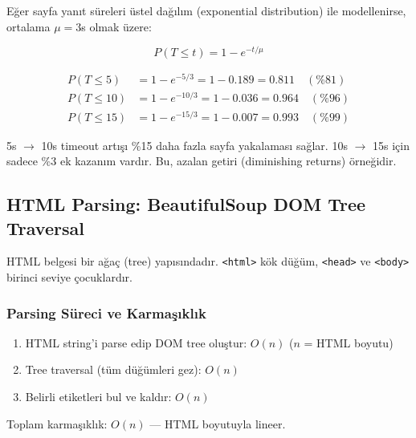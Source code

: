 E\u{g}er sayfa yan{\i}t s\"{u}releri \"{u}stel da\u{g}{\i}l{\i}m (exponential distribution) ile modellenirse, ortalama $\mu = 3$s olmak \"{u}zere:

\begin{equation}
P(T \leq t) = 1 - e^{-t/\mu}
\label{eq:timeout-cdf}
\end{equation}

\begin{align}
P(T \leq 5)  &= 1 - e^{-5/3}  = 1 - 0.189 = 0.811 \quad (\%81) \label{eq:timeout-5} \\
P(T \leq 10) &= 1 - e^{-10/3} = 1 - 0.036 = 0.964 \quad (\%96) \label{eq:timeout-10} \\
P(T \leq 15) &= 1 - e^{-15/3} = 1 - 0.007 = 0.993 \quad (\%99) \label{eq:timeout-15}
\end{align}

\noindent
5s $\to$ 10s timeout art{\i}\c{s}{\i} \%15 daha fazla sayfa yakalamas{\i} sa\u{g}lar. 10s $\to$ 15s i\c{c}in sadece \%3 ek kazan{\i}m vard{\i}r. Bu, azalan getiri (diminishing returns) \"{o}rne\u{g}idir.


\subsection{HTML Parsing: BeautifulSoup DOM Tree Traversal}
\label{subsec:html-parsing}

HTML belgesi bir a\u{g}a\c{c} (tree) yap{\i}s{\i}ndad{\i}r. \texttt{<html>} k\"{o}k d\"{u}\u{g}\"{u}m, \texttt{<head>} ve \texttt{<body>} birinci seviye \c{c}ocuklard{\i}r.

\subsubsection{Parsing S\"{u}reci ve Karma\c{s}{\i}kl{\i}k}

\begin{enumerate}
  \item HTML string'i parse edip DOM tree olu\c{s}tur: $O(n)$ ($n$ = HTML boyutu)
  \item Tree traversal (t\"{u}m d\"{u}\u{g}\"{u}mleri gez): $O(n)$
  \item Belirli etiketleri bul ve kald{\i}r: $O(n)$
\end{enumerate}

\noindent
Toplam karma\c{s}{\i}kl{\i}k: $O(n)$ --- HTML boyutuyla lineer.

